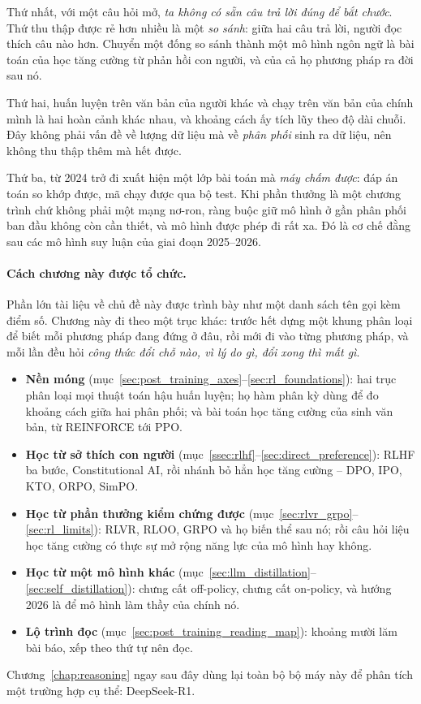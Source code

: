 Thứ nhất, với một câu hỏi mở, \emph{ta không có sẵn câu trả lời đúng để bắt chước}. Thứ thu thập được rẻ hơn nhiều là một \emph{so sánh}: giữa hai câu trả lời, người đọc thích câu nào hơn. Chuyển một đống so sánh thành một mô hình ngôn ngữ là bài toán của học tăng cường từ phản hồi con người, và của cả họ phương pháp ra đời sau nó.

Thứ hai, huấn luyện trên văn bản của người khác và chạy trên văn bản của chính mình là hai hoàn cảnh khác nhau, và khoảng cách ấy tích lũy theo độ dài chuỗi. Đây không phải vấn đề về lượng dữ liệu mà về \emph{phân phối} sinh ra dữ liệu, nên không thu thập thêm mà hết được.

Thứ ba, từ 2024 trở đi xuất hiện một lớp bài toán mà \emph{máy chấm được}: đáp án toán so khớp được, mã chạy được qua bộ test. Khi phần thưởng là một chương trình chứ không phải một mạng nơ-ron, ràng buộc giữ mô hình ở gần phân phối ban đầu không còn cần thiết, và mô hình được phép đi rất xa. Đó là cơ chế đằng sau các mô hình suy luận của giai đoạn 2025--2026.

\paragraph{Cách chương này được tổ chức.} Phần lớn tài liệu về chủ đề này được trình bày như một danh sách tên gọi kèm điểm số. Chương này đi theo một trục khác: trước hết dựng một khung phân loại để biết mỗi phương pháp đang đứng ở đâu, rồi mới đi vào từng phương pháp, và mỗi lần đều hỏi \emph{công thức đổi chỗ nào, vì lý do gì, đổi xong thì mất gì}.

\begin{itemize}
    \item \textbf{Nền móng} (mục~\ref{sec:post_training_axes}--\ref{sec:rl_foundations}): hai trục phân loại mọi thuật toán hậu huấn luyện; họ hàm phân kỳ dùng để đo khoảng cách giữa hai phân phối; và bài toán học tăng cường của sinh văn bản, từ REINFORCE tới PPO.
    \item \textbf{Học từ sở thích con người} (mục~\ref{ssec:rlhf}--\ref{sec:direct_preference}): RLHF ba bước, Constitutional AI, rồi nhánh bỏ hẳn học tăng cường -- DPO, IPO, KTO, ORPO, SimPO.
    \item \textbf{Học từ phần thưởng kiểm chứng được} (mục~\ref{sec:rlvr_grpo}--\ref{sec:rl_limits}): RLVR, RLOO, GRPO và họ biến thể sau nó; rồi câu hỏi liệu học tăng cường có thực sự mở rộng năng lực của mô hình hay không.
    \item \textbf{Học từ một mô hình khác} (mục~\ref{sec:llm_distillation}--\ref{sec:self_distillation}): chưng cất off-policy, chưng cất on-policy, và hướng 2026 là để mô hình làm thầy của chính nó.
    \item \textbf{Lộ trình đọc} (mục~\ref{sec:post_training_reading_map}): khoảng mười lăm bài báo, xếp theo thứ tự nên đọc.
\end{itemize}

Chương~\ref{chap:reasoning} ngay sau đây dùng lại toàn bộ bộ máy này để phân tích một trường hợp cụ thể: DeepSeek-R1.
